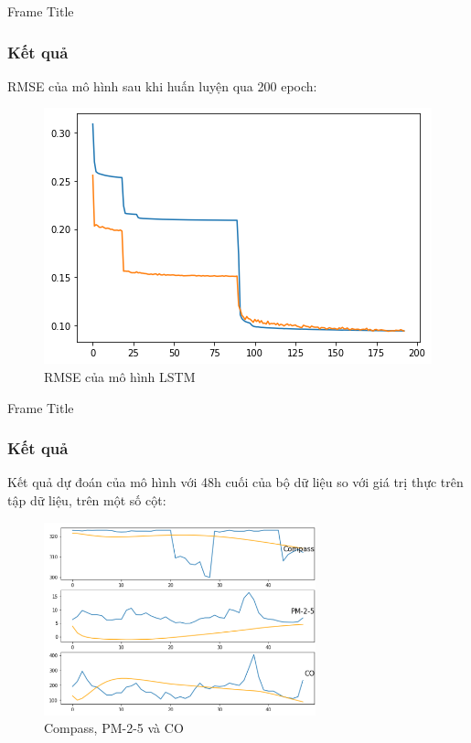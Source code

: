 \documentclass[notheorems,hyperref={bookmarks=true}]{beamer}
\theoremstyle{plain}
\numberwithin{equation}{section}
\begin{document}
\begin{footnotesize}
    \begin{frame}{Frame Title}
	\frametitle{Kết quả}
RMSE của mô hình sau khi huấn luyện qua 200 epoch:
    \begin{figure}[H]
    \centering
    \includegraphics[width=.85\textwidth]{figures/RMSE_LSTM.png}
    \caption[RMSE của mô hình LSTM]{RMSE của mô hình LSTM}
\end{figure}      
	\end{frame}
	
	\begin{frame}{Frame Title}
	\frametitle{Kết quả}
Kết quả dự đoán của mô hình với 48h cuối của bộ dữ liệu so với giá trị thực trên tập dữ liệu, trên một số cột:
\begin{figure}[H]
    \centering
    \includegraphics[width=0.7\textwidth]{figures/LSTM_test6.png}
    \caption[Compass, PM-2-5 và CO]{Compass, PM-2-5 và CO}
\end{figure}      
	\end{frame}


\end{footnotesize}
\end{document}

